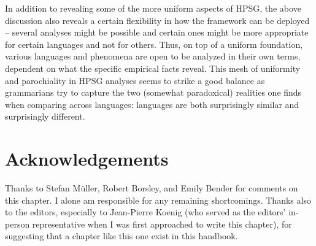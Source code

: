 \documentclass[output=paper
	        ,collection
	        ,collectionchapter
 	        ,biblatex
                ,babelshorthands
                ,newtxmath
                ,draftmode
                ,colorlinks, citecolor=brown
]{langscibook}
\begin{document}
In addition to revealing some of the more uniform aspects of HPSG, the above discussion also reveals a certain flexibility in how the framework can be deployed -- several analyses might be possible and certain ones might be more appropriate for certain languages and not for others. Thus, on top of a uniform foundation, various languages and phenomena are open to be analyzed in their own terms, dependent on what the specific empirical facts reveal. This mesh of uniformity and parochiality in HPSG analyses seems to strike a good balance as grammarians try to capture the two (somewhat paradoxical) realities one finds when comparing across languages: languages are both surprisingly similar and surprisingly different.                 

\section*{Acknowledgements}

Thanks to Stefan M{\"u}ller, Robert Borsley, and Emily Bender for comments on this chapter. I alone am responsible for any remaining shortcomings. Thanks also to the editors, especially to Jean-Pierre Koenig (who served as the editors' in-person representative when I was first approached to write this chapter), for suggesting that a chapter like this one exist in this handbook.  


{\sloppy

\printbibliography[heading=subbibliography,notkeyword=this]
}
\end{document}
